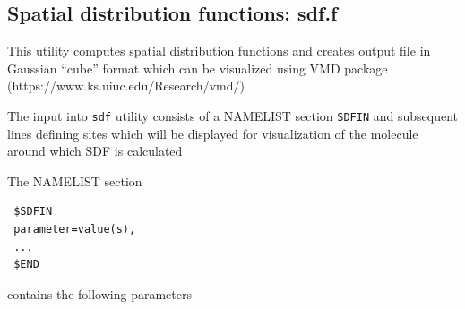 \documentclass{article}
\begin{document}
\subsection{Spatial distribution functions: sdf.f}

This utility computes spatial distribution functions and creates
output file in Gaussian ``cube'' format which can be visualized using
VMD package  \\
(https://www.ks.uiuc.edu/Research/vmd/)

The input into \verb|sdf| utility consists of a NAMELIST section
\verb|SDFIN| and subsequent lines defining sites which will be displayed
for visualization of the molecule around which SDF is calculated

The NAMELIST section

\begin{verbatim}
 $SDFIN
 parameter=value(s),
 ...
 $END
\end{verbatim}

contains the following parameters
\end{document}
